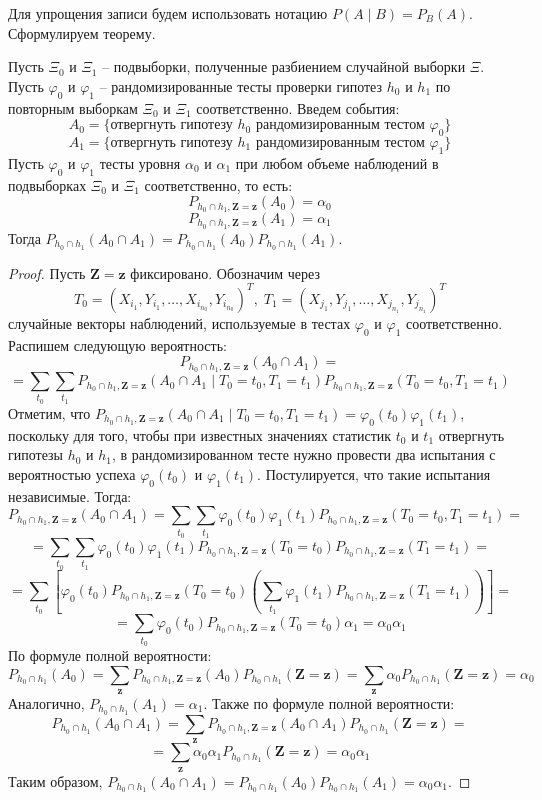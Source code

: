 Для упрощения записи будем использовать нотацию 
$P(A \mid B)=P_{B}(A)$. Сформулируем теорему.
\begin{theorem}\label{main_theorem}
    Пусть $\Xi_0$ и $\Xi_1$ -- подвыборки, полученные разбиением случайной выборки $\Xi$.
    Пусть $\varphi_0$ и $\varphi_1$ -- рандомизированные тесты 
    проверки гипотез $h_0$ и $h_1$ по повторным выборкам 
    $\Xi_0$ и $\Xi_1$ соответственно.
    Введем события:
    $$A_0 = \{\text{отвергнуть гипотезу $h_0$ рандомизированным тестом $\varphi_0$}\}$$ 
    $$A_1 = \{\text{отвергнуть гипотезу $h_1$ рандомизированным тестом $\varphi_1$}\}$$
    Пусть $\varphi_0$ и $\varphi_1$ тесты уровня $\alpha_0$ и $\alpha_1$
    при любом объеме наблюдений в подвыборках $\Xi_0$ и $\Xi_1$ соответственно, то есть:
    $$P_{h_0\cap h_1,\mathbf{Z=z}}(A_0)=\alpha_0$$ 
    $$P_{h_0\cap h_1,\mathbf{Z=z}}(A_1)=\alpha_1$$
    Тогда $P_{h_0\cap h_1}(A_0 \cap A_1)= P_{h_0\cap h_1}(A_0) P_{h_0\cap h_1}(A_1)$.
\end{theorem}
\begin{proof}
    Пусть $\mathbf{Z}=\mathbf{z}$ фиксировано. 
    Обозначим через
    $$T_0=(X_{i_1},Y_{i_1},\ldots,X_{i_{n_0}},Y_{i_{n_0}})^T, \;
    T_1=(X_{j_1},Y_{j_1},\ldots,X_{j_{n_1}},Y_{j_{n_1}})^T$$
    случайные векторы наблюдений, используемые в тестах $\varphi_0$ и 
    $\varphi_1$ соответственно.
    Распишем следующую вероятность:
    $$
    P_{h_0\cap h_1,\mathbf{Z=z}}(A_0 \cap A_1)=
    $$
    $$
    =\sum_{t_0}\sum_{t_1} P_{h_0\cap h_1,\mathbf{Z=z}}(A_0 \cap A_1 \mid T_0=t_0, T_1=t_1)P_{h_0\cap h_1,\mathbf{Z=z}}(T_0=t_0, T_1=t_1)
    $$
    Отметим, что $P_{h_0\cap h_1,\mathbf{Z=z}}(A_0 \cap A_1 \mid T_0=t_0, T_1=t_1)=\varphi_0(t_0)\varphi_1(t_1)$, поскольку
    для того, чтобы при известных значениях статистик $t_0$ и $t_1$ отвергнуть гипотезы $h_0$ и $h_1$, в рандомизированном тесте нужно провести два испытания с вероятностью успеха
    $\varphi_0(t_0)$ и $\varphi_1(t_1)$. Постулируется, что такие испытания независимые. Тогда:
    $$
    P_{h_0\cap h_1,\mathbf{Z=z}}(A_0 \cap A_1)=\sum_{t_0}\sum_{t_1} \varphi_0(t_0) \varphi_1(t_1) P_{h_0\cap h_1,\mathbf{Z=z}}(T_0=t_0, T_1=t_1)=
    $$
    $$
    =\sum_{t_0}\sum_{t_1} \varphi_0(t_0) \varphi_1(t_1) P_{h_0\cap h_1,\mathbf{Z=z}}(T_0=t_0)P_{h_0\cap h_1,\mathbf{Z=z}}(T_1=t_1)=
    $$
    $$
    =\sum_{t_0}\left[ \varphi_0(t_0) P_{h_0\cap h_1,\mathbf{Z=z}}(T_0=t_0) \left(\sum_{t_1}\varphi_1(t_1) P_{h_0\cap h_1,\mathbf{Z=z}}(T_1=t_1)\right)\right]=
    $$
    $$
    = \sum_{t_0} \varphi_0(t_0) P_{h_0\cap h_1,\mathbf{Z=z}}(T_0=t_0) \alpha_1 
    =\alpha_0 \alpha_1
    $$
    По формуле полной вероятности:
    $$
    P_{h_0\cap h_1}(A_0) = \sum_{\mathbf{z}} P_{h_0\cap h_1,\mathbf{Z=z}}(A_0) P_{h_0\cap h_1}(\mathbf{Z}=\mathbf{z})
    = \sum_{\mathbf{z}} \alpha_0 P_{h_0\cap h_1}(\mathbf{Z}=\mathbf{z})=\alpha_0
    $$
    Аналогично, $P_{h_0\cap h_1}(A_1)=\alpha_1$. Также по формуле полной вероятности:
    $$
    P_{h_0\cap h_1}(A_0 \cap A_1) = \sum_{\mathbf{z}} P_{h_0\cap h_1,\mathbf{Z=z}}(A_0 \cap A_1) P_{h_0\cap h_1}(\mathbf{Z}=\mathbf{z})=
    $$
    $$
    = \sum_{\mathbf{z}} \alpha_0 \alpha_1 P_{h_0\cap h_1}(\mathbf{Z}=\mathbf{z})
    = \alpha_0 \alpha_1
    $$
    Таким образом, $P_{h_0\cap h_1}(A_0 \cap A_1)=P_{h_0\cap h_1}(A_0) P_{h_0\cap h_1}(A_1)=\alpha_0 \alpha_1$.
\end{proof}
